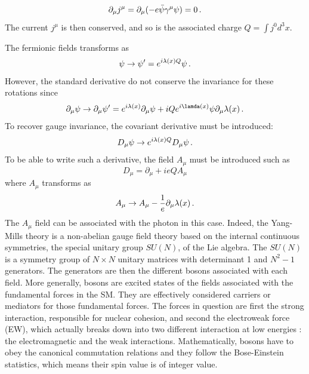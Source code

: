 \begin{equation}
    \partial_{\mu}j^{\mu} = \partial_{\mu}(-e\Bar{\psi}\gamma^{\mu}\psi) = 0 \mend
\end{equation}
The current $j^{\mu}$ is then conserved, and so is the associated charge $Q = \int j^{0}d^3 x$.

The fermionic fields transforms as
\begin{equation}
    \psi \rightarrow \psi' = e^{i\lambda(x)Q}\psi \mend
\end{equation}
However, the standard derivative do not conserve the invariance for these rotations since
\begin{equation}
    \partial_{\mu}\psi \rightarrow \partial_{\mu}\psi' = e^{i\lambda(x)}\partial_{\mu}\psi + iQe^{i\lamda(x)}\psi\partial_{\mu}\lambda(x) \mend
\end{equation}
To recover gauge invariance, the covariant derivative must be introduced:
\begin{equation}
    D_{\mu}\psi \rightarrow e^{i\lambda(x)Q}D_{\mu}\psi \mend
\end{equation}
To be able to write such a derivative, the field $A_{\mu}$ must be introduced such as
\begin{equation}
    D_{\mu} = \partial_{\mu} + ieQA_{\mu}
\end{equation}
where $A_{\mu}$ transforms as
\begin{equation}
    A_{\mu} \rightarrow A_{\mu} - \frac{1}{e}\partial_{\mu}\lambda(x) \mend
\end{equation}
The $A_{\mu}$ field can be associated with the photon in this case.
Indeed, the Yang-Mills theory \cite{PhysRev.96.191} is a non-abelian gauge field theory based on the internal continuous symmetries, the special unitary group $SU(N)$, of the Lie algebra. The $SU(N)$ is a symmetry group of $N \times N$ unitary matrices with determinant 1 and $N^2 -1$ generators. The generators are then the different bosons associated with each field.
More generally, bosons are excited states of the fields associated with the fundamental forces in the SM. They are effectively considered carriers or mediators for those fundamental forces. The forces in question are first the strong interaction, responsible for nuclear cohesion, and second the electroweak force (EW), which actually breaks down into two different interaction at low energies : the electromagnetic and the weak interactions.
Mathematically, bosons have to obey the canonical commutation relations and they follow the Bose-Einstein statistics, which means their spin value is of integer value.

